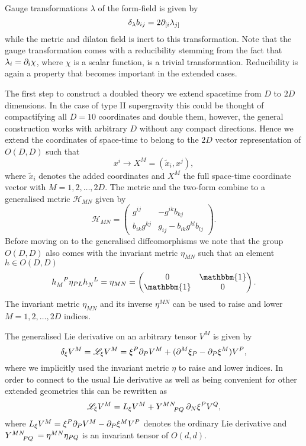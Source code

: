 Gauge transformations $\lambda$ of the form-field is given by 
\begin{equation}
    \delta_\lambda b_{ij} = 2\partial_{[i}\lambda_{j]} 
\end{equation}
while the metric and dilaton field is inert to this transformation. Note that the gauge transformation comes with a reducibility stemming from the fact that $\lambda_i = \partial_i \chi$, where $\chi$ is a scalar function, is a trivial transformation. Reducibility is again a property that becomes important in the extended cases. 

The first step to construct a doubled theory we extend spacetime from $D$ to $2D$ dimensions. In the case of type II supergravity this could be thought of compactifying all $D=10$ coordinates and double them, however, the general construction works with arbitrary $D$ without any compact directions. Hence we extend the coordinates of space-time to belong to the $2D$ vector representation of $O(D,D)$ such that 
\begin{equation}
    x^{i}\to X^M = (\tilde{x}_i,x^j),
\end{equation}
where $\tilde{x}_i$ denotes the added coordinates and $X^M$ the full space-time coordinate vector with $M=1,2,\ldots,2D$. The metric and the two-form combine to a generalised metric $\mathcal{H}_{MN}$ given by 
\begin{equation}
    \mathcal{H}_{MN} = \begin{pmatrix}g^{ij} & -g^{ik}b_{kj}\\
                            b_{ik}g^{kj} & g_{ij}-b_{ik}g^{kl}b_{lj}\end{pmatrix}.
\end{equation}
Before moving on to the generalised diffeomorphisms we note that the group $O(D,D)$ also comes with the invariant metric $\eta_{MN}$ such that an element $h\in O(D,D)$
\begin{equation}
\tensor{h}{_M^P}\eta_{PL}\tensor{h}{_N^L} = \eta_{MN} = \begin{pmatrix}0&\mathbbm{1}\\ \mathbbm{1}&0\end{pmatrix}.
\end{equation}
The invariant metric $\eta_{MN}$ and its inverse $\eta^{MN}$ can be used to raise and lower $M=1,2,\ldots,2D$ indices. 

The generalised Lie derivative on an arbitrary tensor $V^M$ is given by 
\begin{equation}
    \delta_\xi V^M = \mathscr{L}_\xi V^M = \xi^P\partial_P V^M+(\partial^M \xi_P-\partial_P\xi^M)V^P,
\end{equation}
where we implicitly used the invariant metric $\eta$ to raise and lower indices. In order to connect to the usual Lie derivative as well as being convenient for other extended geometries this can be rewritten as 
\begin{equation}
    \mathscr{L}_\xi V^M = L_\xi V^M + \tensor{Y}{^M^N_P_Q}\pd_N\xi^PV^Q,
\end{equation}
where $L_\xi V^M=\xi^P\partial_PV^M-\partial_P\xi^M V^P$ denotes the ordinary Lie derivative and $\tensor{Y}{^M^N_P_Q}=\eta^{MN}\eta_{PQ}$ is an invariant tensor of $O(d,d)$. 

